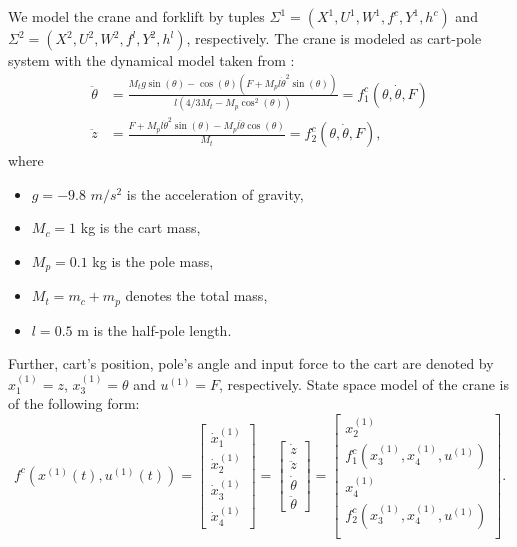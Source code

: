 We model the crane and forklift by tuples $\Sigma^1=(X^1,U^1,W^1,f^c,Y^1,h^c)$ and $\Sigma^2=(X^2,U^2,W^2,f^l,Y^2,h^l)$, respectively. The crane is modeled as cart-pole system with the dynamical model taken from \cite{Barto1983}:
\begin{align*}
	\ddot{\theta} &= \frac{M_tg\sin(\theta) - \cos(\theta)(F + M_pl \dot{\theta}^2 \sin(\theta))}{l(4/3 M_t- M_p \cos^2(\theta))}=f^c_1(\theta,\dot{\theta},F)\\
	\ddot{z}&= \frac{F + M_pl \dot{\theta}^2 \sin(\theta)-M_pl \ddot{\theta} \cos(\theta)}{M_t}=f^c_2(\theta,\dot{\theta},F),
\end{align*}
where
\begin{itemize}
	\item[] $g=-9.8$ $m/s^2$ is the acceleration of gravity,
	\item[] $M_c=1$ kg is the cart mass,
	\item[] $M_p=0.1$ kg is the pole mass,
	\item[] $M_t=m_c+m_p$ denotes the total mass,
	\item[] $l=0.5$ m is the half-pole length.
\end{itemize}
Further, cart's position, pole's angle and input force to the cart are denoted by $x_1^{(1)}=z$, $x_3^{(1)}=\theta$ and $u^{(1)}=F$, respectively. State space model of the crane is of the following form:
\[f^{c}(x^{(1)}(t),u^{(1)}(t))=\begin{bmatrix}
	\dot{x}_1^{(1)}\\
	\dot{x}_2^{(1)}\\
	\dot{x}_3^{(1)}\\
	\dot{x}_4^{(1)}
\end{bmatrix}=\begin{bmatrix}
\dot{z}\\
\ddot{z}\\
\dot{\theta}\\
\ddot{\theta}
\end{bmatrix}=
\begin{bmatrix}
	x_2^{(1)}\\
	f^c_1(x_3^{(1)},x_4^{(1)},u^{(1)})\\
	x_4^{(1)}\\
	f^c_2(x_3^{(1)},x_4^{(1)},u^{(1)})\\
\end{bmatrix}.\]
